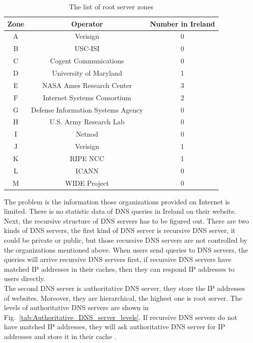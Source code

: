 \begin{table}[hbt!]
    \centering
    \begin{tabular}{|c|c|c|}
        \hline
          Zone & Operator & Number in Ireland\\    
        \hline
        A & Verisign & 0 \\
        \hline
        B & USC-ISI & 0\\
        \hline
        C & Cogent Communications & 0 \\
        \hline
        D & University of Maryland & 1\\
        \hline
        E & NASA Ames Research Center & 3\\
        \hline
        F & Internet Systems Consortium & 2\\
        \hline
        G & Defense Information Systems Agency & 0\\
        \hline
        H & U.S. Army Research Lab & 0\\
        \hline
        I & Netnod & 0\\
        \hline
        J & Verisign & 1\\
        \hline
        K & RIPE NCC & 1\\
        \hline
        L & ICANN & 0\\
        \hline
        M & WIDE Project & 0\\
        \hline
    \end{tabular}
    \caption{The list of root server zones \cite{root_servers_org}}
    \label{tab:root_server_zone_list}
\end{table}

The problem is the information those organizations provided on Internet is limited. There is no statistic data of DNS queries in Ireland on their website.
\\

Next, the recursive structure of DNS servers has to be figured out. There are two kinds of DNS servers, the first kind of DNS server is recursive DNS server, it could be private or public, but those recursive DNS servers are not controlled by the organizations mentioned above. When users send queries to DNS servers, the queries will arrive recursive DNS servers first, if recursive DNS servers have matched IP addresses in their caches, then they can respond IP addresses to users directly. 
\\

The second DNS server is authoritative DNS server, they store the IP addresses of websites. Moreover, they are hierarchical, the highest one is root server. The levels of authoritative DNS servers are shown in Fig.~\ref{tab:Authoritative_DNS_server_levels}. If recursive DNS servers do not have matched IP addresses, they will ask authoritative DNS server for IP addresses and store it in their cache \cite{Authoritative_vs_Recursive_DNS_server}.
\\

